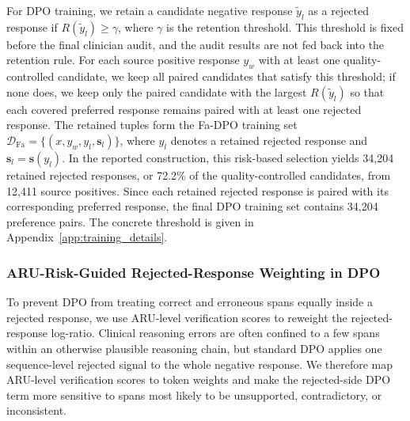 \documentclass[a4paper,fleqn,doubleblind]{cas-sc}
\begin{document}
For DPO training, we retain a candidate negative response $\tilde{y}_l$ as a rejected response if $R(\tilde{y}_l)\ge \gamma$, where $\gamma$ is the retention threshold. This threshold is fixed before the final clinician audit, and the audit results are not fed back into the retention rule. For each source positive response $y_w$ with at least one quality-controlled candidate, we keep all paired candidates that satisfy this threshold; if none does, we keep only the paired candidate with the largest $R(\tilde{y}_l)$ so that each covered preferred response remains paired with at least one rejected response. The retained tuples form the Fa-DPO training set $\mathcal{D}_{\text{Fa}}=\{(x,y_w,y_l,\mathbf{s}_l)\}$, where $y_l$ denotes a retained rejected response and $\mathbf{s}_l=\mathbf{s}(y_l)$. In the reported construction, this risk-based selection yields 34,204 retained rejected responses, or 72.2\% of the quality-controlled candidates, from 12,411 source positives. Since each retained rejected response is paired with its corresponding preferred response, the final DPO training set contains 34,204 preference pairs. The concrete threshold is given in Appendix~\ref{app:training_details}.

\subsubsection{ARU-Risk-Guided Rejected-Response Weighting in DPO}
\label{sec:token_reweighting}

To prevent DPO from treating correct and erroneous spans equally inside a rejected response, we use ARU-level verification scores to reweight the rejected-response log-ratio. Clinical reasoning errors are often confined to a few spans within an otherwise plausible reasoning chain, but standard DPO applies one sequence-level rejected signal to the whole negative response. We therefore map ARU-level verification scores to token weights and make the rejected-side DPO term more sensitive to spans most likely to be unsupported, contradictory, or inconsistent.
\end{document}
